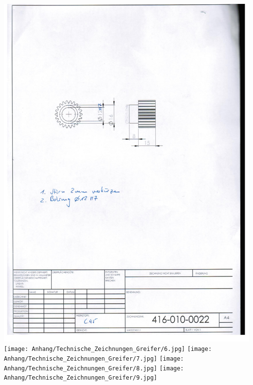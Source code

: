 \includegraphics[height=1\textheight]{Anhang/Technische_Zeichnungen_Greifer/5.jpg}
\newpage
\texttt{[image: Anhang/Technische\_Zeichnungen\_Greifer/6.jpg]}
\newpage
\texttt{[image: Anhang/Technische\_Zeichnungen\_Greifer/7.jpg]}
\newpage
\texttt{[image: Anhang/Technische\_Zeichnungen\_Greifer/8.jpg]}
\newpage
\texttt{[image: Anhang/Technische\_Zeichnungen\_Greifer/9.jpg]}
\newpage

